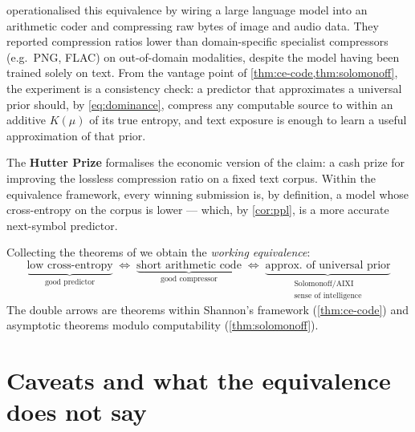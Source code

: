 \documentclass[12pt,a4paper]{article}
\theoremstyle{plain}
\theoremstyle{definition}
\begin{document}
\citet{deletang2024language} operationalised this equivalence by
wiring a large language model into an arithmetic coder and
compressing raw bytes of image and audio data.  They reported
compression ratios lower than domain-specific specialist compressors
(e.g.\ PNG, FLAC) on out-of-domain modalities, despite the model
having been trained solely on text.  From the vantage point of
\cref{thm:ce-code,thm:solomonoff}, the experiment is a consistency
check: a predictor that approximates a universal prior should, by
\eqref{eq:dominance}, compress any computable source to within an
additive $K(\mu)$ of its true entropy, and text exposure is enough
to learn a useful approximation of that prior.

The \textbf{Hutter Prize} \citep{hutter2005universal} formalises the
economic version of the claim: a cash prize for improving the
lossless compression ratio on a fixed text corpus.  Within the
equivalence framework, every winning submission is, by definition, a
model whose cross-entropy on the corpus is lower --- which, by
\cref{cor:ppl}, is a more accurate next-symbol predictor.

Collecting the theorems of
 we obtain the \emph{working
equivalence}:
\begin{equation}
  \underbrace{\text{low cross-entropy}}_{\text{good predictor}}
  \;\Longleftrightarrow\;
  \underbrace{\text{short arithmetic code}}_{\text{good compressor}}
  \;\Longleftrightarrow\;
  \underbrace{\text{approx.\ of universal prior}}_{\substack{\text{Solomonoff/AIXI}\\\text{sense of intelligence}}}
  \label{eq:chain}
\end{equation}
The double arrows are theorems within Shannon's framework
(\cref{thm:ce-code}) and asymptotic theorems modulo computability
(\cref{thm:solomonoff}).

\section{Caveats and what the equivalence does not say}
\label{sec:caveats}
\end{document}
